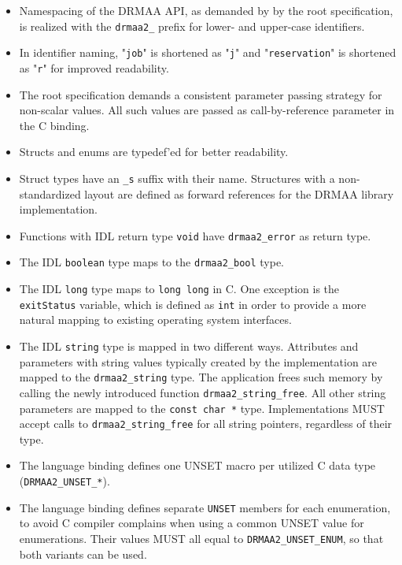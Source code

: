 \documentclass{article}
\newcommand{\h}[1]{\texttt{#1}}
\newcommand{\rat}[1]{}
\begin{document}
\begin{itemize}
\item Namespacing of the DRMAA API, as demanded by by the root specification, is realized with the \h{drmaa2\_} prefix for lower- and upper-case identifiers.
\item In identifier naming, "\h{job}" is shortened as "\h{j}" and "\h{reservation}" is shortened as "\h{r}" for improved readability.
\item The root specification demands a consistent parameter passing strategy for non-scalar values. All such values are passed as call-by-reference parameter in the C binding.
\item Structs and enums are typedef'ed for better readability.
\item Struct types have an \h{\_s} suffix with their name. Structures with a non-standardized layout are defined as forward references for the DRMAA library implementation. \rat{This avoids the usage of void* pointers, f.e. with dictionaries and lists.}
\item Functions with IDL return type \h{void} have \h{drmaa2\_error} as return type.
\item The IDL \h{boolean} type maps to the \h{drmaa2\_bool} type.
\item The IDL  \h{long} type maps to \h{long long} in C. One exception is the \h{exitStatus} variable, which is defined as \h{int} in order to provide a more natural mapping to existing operating system interfaces.
\item The IDL \h{string} type is mapped in two different ways. Attributes and parameters with string values typically created by the implementation are mapped to the \h{drmaa2\_string} type. The application frees such memory by calling the newly introduced function \h{drmaa2\_string\_free}. All other string parameters are mapped to the \h{const char *} type. Implementations MUST accept calls to \h{drmaa2\_string\_free} for all string pointers, regardless of their type. \rat{This means that even if the implementation returns string literal pointers at some occasions, \h{drmaa2\_string\_free} SHALL not fail for this. This may be realized by avoiding string literal pointers at all, or by maintaining a list of malloced pointers.}
\item The language binding defines one UNSET macro per utilized C data type (\h{DRMAA2\_UNSET\_*}). \rat{For UNSET values, the language binding adheres mainly to typical language conventions and not to GLUE as recommended in the root spec.}
\item The language binding defines separate \h{UNSET} members for each enumeration, to avoid C compiler complains when using a common UNSET value for enumerations. Their values MUST all equal to \h{DRMAA2\_UNSET\_ENUM}, so that both variants can be used.

\end{itemize}
\end{document}
